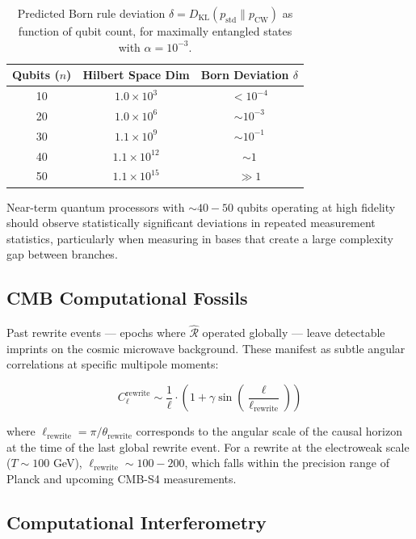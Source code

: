 \documentclass[12pt,a4paper]{article}
\begin{document}
\begin{table}[h]
\centering
\begin{tabular}{ccc}
\toprule
Qubits ($n$) & Hilbert Space Dim & Born Deviation $\delta$ \\
\midrule
10 & $1.0 \times 10^3$ & $< 10^{-4}$ \\
20 & $1.0 \times 10^6$ & $\sim 10^{-3}$ \\
30 & $1.1 \times 10^9$ & $\sim 10^{-1}$ \\
40 & $1.1 \times 10^{12}$ & $\sim 1$ \\
50 & $1.1 \times 10^{15}$ & $\gg 1$ \\
\bottomrule
\end{tabular}
\caption{Predicted Born rule deviation $\delta = D_{\text{KL}}(p_{\text{std}} \| p_{\text{CW}})$ as function of qubit count, for maximally entangled states with $\alpha = 10^{-3}$.}
\label{tab:born}
\end{table}

Near-term quantum processors with $\sim 40-50$ qubits operating at high fidelity should observe statistically significant deviations in repeated measurement statistics, particularly when measuring in bases that create a large complexity gap between branches.

\subsection{CMB Computational Fossils}

Past rewrite events — epochs where $\hat{\mathcal{R}}$ operated globally — leave detectable imprints on the cosmic microwave background. These manifest as subtle angular correlations at specific multipole moments:

\begin{equation}
C_\ell^{\text{rewrite}} \sim \frac{1}{\ell} \cdot \left(1 + \gamma \sin\left(\frac{\ell}{\ell_{\text{rewrite}}}\right)\right)
\end{equation}

where $\ell_{\text{rewrite}} = \pi / \theta_{\text{rewrite}}$ corresponds to the angular scale of the causal horizon at the time of the last global rewrite event. For a rewrite at the electroweak scale ($T \sim 100$ GeV), $\ell_{\text{rewrite}} \sim 100-200$, which falls within the precision range of Planck and upcoming CMB-S4 measurements.

\subsection{Computational Interferometry}
\end{document}
